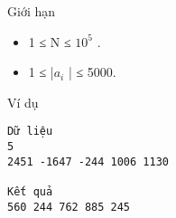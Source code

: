 Giới hạn
\begin{itemize}
	\item     1 ≤ N ≤ $10^{5}$    .   
	\item     1 ≤ |$a_{i}$    | ≤ 5000.   
\end{itemize}
Ví dụ
\begin{verbatim}
Dữ liệu
5
2451 -1647 -244 1006 1130

Kết quả
560 244 762 885 245	
\end{verbatim}